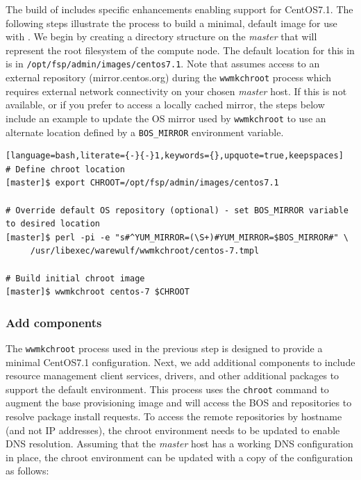 \documentclass[letterpaper]{article}
\newcommand{\baseOS}{CentOS7.1}
\begin{document}
The \FSP{} build of \Warewulf{} includes specific enhancements enabling support for
\baseOS{}. The following steps illustrate the process to build a minimal, default
image for use with \Warewulf{}.  We begin by creating a directory structure on the 
{\em master} that will represent the root filesystem of the compute node. The 
default location for this in \FSP{} is in
\texttt{/opt/fsp/admin/images/centos7.1}. Note that \Warewulf{} assumes access to
an external repository (mirror.centos.org) during the \texttt{wwmkchroot}
process which requires external network connectivity on your chosen {\em
  master} host. If this is not available, or if you prefer to access a locally cached
mirror, the steps below include an example to update the OS mirror used by
\texttt{wwmkchroot} to use an alternate location defined by a
\texttt{BOS\_MIRROR} environment variable.

\begin{lstlisting}[language=bash,literate={-}{-}1,keywords={},upquote=true,keepspaces]
# Define chroot location 
[master]$ export CHROOT=/opt/fsp/admin/images/centos7.1

# Override default OS repository (optional) - set BOS_MIRROR variable to desired location
[master]$ perl -pi -e "s#^YUM_MIRROR=(\S+)#YUM_MIRROR=$BOS_MIRROR#" \
     /usr/libexec/warewulf/wwmkchroot/centos-7.tmpl

# Build initial chroot image
[master]$ wwmkchroot centos-7 $CHROOT
\end{lstlisting}

\subsubsection{Add \FSP{} components}

The \texttt{wwmkchroot} process used in the previous step is designed to
provide a minimal \baseOS{} configuration. Next, we add additional components to
include resource management client services, \InfiniBand{} drivers, and other
additional packages to support the default \FSP{} environment.  This process uses
the \texttt{chroot} command to augment the base provisioning image and will
access the BOS and \FSP{} repositories to resolve package install requests. To
access the remote repositories by hostname (and not IP addresses), the chroot
environment needs to be updated to enable DNS resolution. Assuming that
the {\em master} host has a working DNS configuration in place, the chroot environment can
be updated with a copy of the configuration as follows:
\end{document}
